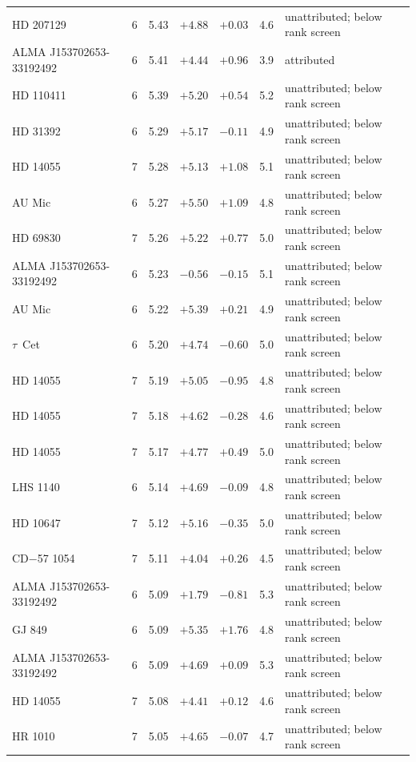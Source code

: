\begin{tabular}{@{}llrrrrl@{}}
HD 207129 & 6 & 5.43 & $+4.88$ & $+0.03$ & 4.6 & unattributed; below rank screen \\
ALMA J153702653-33192492 & 6 & 5.41 & $+4.44$ & $+0.96$ & 3.9 & attributed \\
HD 110411 & 6 & 5.39 & $+5.20$ & $+0.54$ & 5.2 & unattributed; below rank screen \\
HD 31392 & 6 & 5.29 & $+5.17$ & $-0.11$ & 4.9 & unattributed; below rank screen \\
HD 14055 & 7 & 5.28 & $+5.13$ & $+1.08$ & 5.1 & unattributed; below rank screen \\
AU Mic & 6 & 5.27 & $+5.50$ & $+1.09$ & 4.8 & unattributed; below rank screen \\
HD 69830 & 7 & 5.26 & $+5.22$ & $+0.77$ & 5.0 & unattributed; below rank screen \\
ALMA J153702653-33192492 & 6 & 5.23 & $-0.56$ & $-0.15$ & 5.1 & unattributed; below rank screen \\
AU Mic & 6 & 5.22 & $+5.39$ & $+0.21$ & 4.9 & unattributed; below rank screen \\
$\tau$~Cet & 6 & 5.20 & $+4.74$ & $-0.60$ & 5.0 & unattributed; below rank screen \\
HD 14055 & 7 & 5.19 & $+5.05$ & $-0.95$ & 4.8 & unattributed; below rank screen \\
HD 14055 & 7 & 5.18 & $+4.62$ & $-0.28$ & 4.6 & unattributed; below rank screen \\
HD 14055 & 7 & 5.17 & $+4.77$ & $+0.49$ & 5.0 & unattributed; below rank screen \\
LHS 1140 & 6 & 5.14 & $+4.69$ & $-0.09$ & 4.8 & unattributed; below rank screen \\
HD 10647 & 7 & 5.12 & $+5.16$ & $-0.35$ & 5.0 & unattributed; below rank screen \\
CD$-$57 1054 & 7 & 5.11 & $+4.04$ & $+0.26$ & 4.5 & unattributed; below rank screen \\
ALMA J153702653-33192492 & 6 & 5.09 & $+1.79$ & $-0.81$ & 5.3 & unattributed; below rank screen \\
GJ 849 & 6 & 5.09 & $+5.35$ & $+1.76$ & 4.8 & unattributed; below rank screen \\
ALMA J153702653-33192492 & 6 & 5.09 & $+4.69$ & $+0.09$ & 5.3 & unattributed; below rank screen \\
HD 14055 & 7 & 5.08 & $+4.41$ & $+0.12$ & 4.6 & unattributed; below rank screen \\
HR 1010 & 7 & 5.05 & $+4.65$ & $-0.07$ & 4.7 & unattributed; below rank screen \\

\end{tabular}
